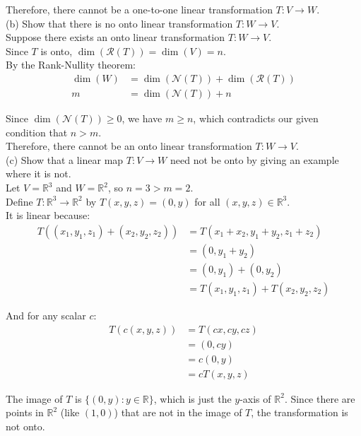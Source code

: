 \documentclass{article}
\begin{document}
Therefore, there cannot be a one-to-one linear transformation $T : V \to W$. \\

(b) Show that there is no onto linear transformation $T : W \to V$. \\

Suppose there exists an onto linear transformation $T : W \to V$. \\

Since $T$ is onto, $\dim(\mathcal{R}(T)) = \dim(V) = n$. \\

By the Rank-Nullity theorem:
\begin{align*}
\dim(W) &= \dim(\mathcal{N}(T)) + \dim(\mathcal{R}(T))\\
m &= \dim(\mathcal{N}(T)) + n
\end{align*}

Since $\dim(\mathcal{N}(T)) \geq 0$, we have $m \geq n$, which contradicts our given condition that $n > m$. \\

Therefore, there cannot be an onto linear transformation $T : W \to V$. \\

(c) Show that a linear map $T : V \to W$ need not be onto by giving an example where it is not. \\

Let $V = \mathbb{R}^3$ and $W = \mathbb{R}^2$, so $n = 3 > m = 2$. \\

Define $T: \mathbb{R}^3 \to \mathbb{R}^2$ by $T(x, y, z) = (0, y)$ for all $(x, y, z) \in \mathbb{R}^3$. \\

It is linear because:
\begin{align*}
T((x_1, y_1, z_1) + (x_2, y_2, z_2)) &= T(x_1 + x_2, y_1 + y_2, z_1 + z_2)\\
&= (0, y_1 + y_2)\\
&= (0, y_1) + (0, y_2)\\
&= T(x_1, y_1, z_1) + T(x_2, y_2, z_2)
\end{align*}

And for any scalar $c$:
\begin{align*}
T(c(x, y, z)) &= T(cx, cy, cz)\\
&= (0, cy)\\
&= c(0, y)\\
&= cT(x, y, z)
\end{align*}

The image of $T$ is $\{(0, y) : y \in \mathbb{R}\}$, which is just the $y$-axis of $\mathbb{R}^2$. Since there are points in $\mathbb{R}^2$ (like $(1, 0)$) that are not in the image of $T$, the transformation is not onto.
\end{document}
